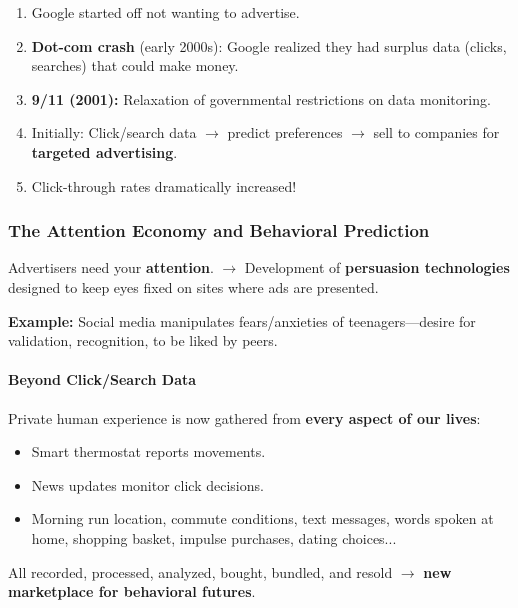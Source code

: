 \begin{enumerate}
  \item Google started off not wanting to advertise.
  \item \textbf{Dot-com crash} (early 2000s): Google realized they had surplus data (clicks, searches) that could make money.
  \item \textbf{9/11 (2001):} Relaxation of governmental restrictions on data monitoring.
  \item Initially: Click/search data $\to$ predict preferences $\to$ sell to companies for \textbf{targeted advertising}.
  \item Click-through rates dramatically increased!
\end{enumerate}

\separator

\subsubsection{The Attention Economy and Behavioral Prediction}

\begin{keybox}
Advertisers need your \textbf{attention}. $\to$ Development of \textbf{persuasion technologies} designed to keep eyes fixed on sites where ads are presented.

\textbf{Example:} Social media manipulates fears/anxieties of teenagers---desire for validation, recognition, to be liked by peers.
\end{keybox}

\paragraph*{Beyond Click/Search Data}

Private human experience is now gathered from \textbf{every aspect of our lives}:
\begin{itemize}
  \item Smart thermostat reports movements.
  \item News updates monitor click decisions.
  \item Morning run location, commute conditions, text messages, words spoken at home, shopping basket, impulse purchases, dating choices...
\end{itemize}

All recorded, processed, analyzed, bought, bundled, and resold $\to$ \textbf{new marketplace for behavioral futures}.

